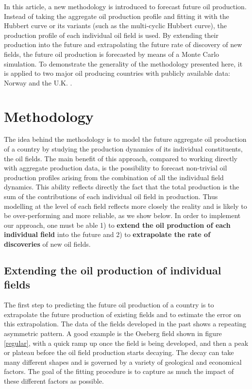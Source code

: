 \documentclass[review]{elsarticle}
\begin{document}
In this article, a new methodology is introduced to forecast future
oil production. Instead of taking the aggregate oil production profile
and fitting it with the Hubbert curve or its variants (such as the
multi-cyclic Hubbert curve), the production profile of each individual
oil field is used. By extending their production into the future and
extrapolating the future rate of discovery of new fields, the future
oil production is forecasted by means of a Monte Carlo simulation.
To demonstrate the generality of the methodology presented here,
it is applied to two major oil producing countries with publicly available
data: Norway  and the U.K. \citep{GOVUK2014}.


\section{Methodology}

The idea behind the methodology is to model the future aggregate oil
production of a country by studying the production dynamics of its
individual constituents, the oil fields. The main benefit of this
approach, compared to working directly with aggregate production data,
is the possibility to forecast non-trivial oil production profiles
arising from the combination of all the individual field
dynamics. This ability reflects directly the fact that the total
production is the sum of the contributions of each individual
oil field in production. Thus modelling at the level of each field
reflects more closely the reality and is likely to be over-performing
and more reliable, as we show below.
In order to implement our approach, one must be able 1) to \textbf{extend
the oil production of each individual field} into the future and 2)
to \textbf{extrapolate the rate of discoveries} of new oil fields.


\subsection{Extending the oil production of individual fields}

The first step to predicting the future oil production of a country
is to extrapolate the future production of existing fields and to
estimate the error on this extrapolation. The data of the fields developed
in the past shows a repeating asymmetric pattern. A good example is
the Oseberg field shown in figure \ref{regular}, with a quick ramp
up once the field is being developed, and then a peak or plateau before
the oil field production starts decaying. The decay can take many different shapes
and is governed by a variety of geological and economical factors.
The goal of the fitting procedure is to capture as much the impact of
these different factors as possible.
\end{document}
